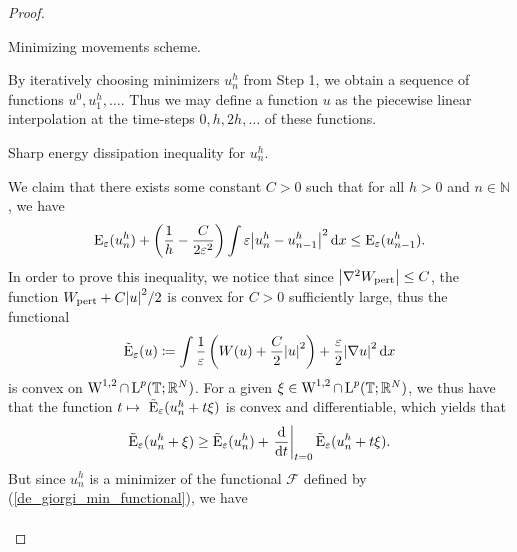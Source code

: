 \begin{proof}
\begin{description}[wide=0pt]
		\item[Step 2:] Minimizing movements scheme.
		
		By iteratively choosing minimizers $ u_{ n }^{ h } $ from Step 1, we 
		obtain a sequence of functions $ u^{ 0 }, u_{ 1 }^{ h } 
		, \dotsc $. Thus we may define a function $ u  $ as the piecewise 
		linear interpolation at the time-steps $ 0, h , 2h, \dotsc $ of these 
		functions.
		
		\item[Step 3:] Sharp energy dissipation inequality for $ u_{ n }^{ h } 
		$.
		
		We claim that there exists some constant $ C > 0 $ such that for all $ h > 0 $ and $ n \in \mathbb{ N } $, we have
		\begin{equation}
			\label{discrete_optimal_energy_dissipation}
			\operatorname{E}_{ \varepsilon } ( u_{ n }^{ h } )
			+
			\left( \frac{ 1 }{ h } - \frac{ C }{ 2 \varepsilon^{ 2 } } \right)
			\int \varepsilon \abs{ u_{ n }^{ h } - u_{ n - 1 }^{ h } }^{ 2 } \dd{ x }
			\leq
			\operatorname{E}_{ \varepsilon } ( u_{ n - 1 }^{ h } ).
		\end{equation}
		In order to prove this inequality, we notice that since $ \abs{ \nabla^{ 2 } W_{ \mathrm{pert} } } \leq C $, the function $ W_{ \mathrm{pert} } + C \abs{ u }^{ 2 }/2 $ is convex for $ C > 0 $ sufficiently large, thus the functional 
		\begin{equation*}
			\tilde{\operatorname{E}}_{ \varepsilon }  ( u )
			\coloneqq
			\int 
			\frac{ 1 }{ \varepsilon }
			\left( W ( u ) + \frac{ C }{ 2 } \abs{ u }^{ 2 } \right)
			+
			\frac{ \varepsilon}{ 2 }
			\abs{ \nabla u }^{ 2 }
			\dd{ x }
		\end{equation*}
		is convex on $ \operatorname{W}^{ 1 , 2 } \cap \operatorname{L}^{ p } ( \operatorname{\mathbb{T}} ; \mathbb{ R }^{ N } ) $. For a given $ \xi \in \operatorname{W}^{ 1 , 2 } \cap \operatorname{L}^{ p } ( \operatorname{\mathbb{T}} ; \mathbb{ R }^{ N } ) $, we thus have that the function
		$ t \mapsto \ \tilde{\operatorname{E}}_{ \varepsilon } ( u_{ n }^{ h } + t \xi ) $ is convex and differentiable, which yields that
		\begin{equation}
			\label{convexity_at_time_1}
			\tilde{\operatorname{E}}_{ \varepsilon } ( u_{ n }^{ h } + \xi )
			\geq
			\tilde{\operatorname{E}}_{ \varepsilon } ( u_{ n }^{ h } ) + 
			\left.\dv{ t }\right|_{ t = 0 } \tilde{\operatorname{E}}_{ \varepsilon } ( u_{ n }^{ h } + t \xi).
		\end{equation} 
		But since $ u_{ n }^{ h } $ is a minimizer of the functional $\mathcal{ 
		F }$ defined by (\ref{de_giorgi_min_functional}), we have
		\begin{align*}

\end{align*}
\end{description}
\end{proof}

